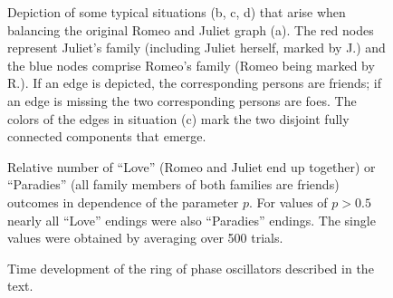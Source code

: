 \documentclass{scrartcl}
\begin{document}
\begin{figure}
    \centering
    \def\svgwidth{0.9\textwidth}
    
    \caption{Depiction of some typical situations (b, c, d) that arise when
        balancing the original Romeo and Juliet graph (a). The red nodes
        represent Juliet's family (including Juliet herself, marked by J.) and
        the blue nodes comprise Romeo's family (Romeo being marked by
        R.). If an edge is depicted, the corresponding persons are friends;
        if an edge is missing the two corresponding persons are foes. The
        colors of the edges in situation (c) mark the two disjoint fully
        connected components that emerge.}
    \label{fig:D41}
\end{figure}

\begin{figure}
    \centering
    \caption{Relative number of \enquote{Love} (Romeo and Juliet end up
    together) or \enquote{Paradies} (all family members of both families
    are friends) outcomes in dependence of the parameter $p$. For values of $p > 0.5$ nearly all
    \enquote{Love} endings were also \enquote{Paradies} endings. The single
    values were obtained by averaging over 500 trials.}
    \label{fig:D412}
\end{figure}

\begin{figure}
    \centering
    \caption{Time development of the ring of phase oscillators described in the text.}
    \label{fig:d42}
\end{figure}
\end{document}
